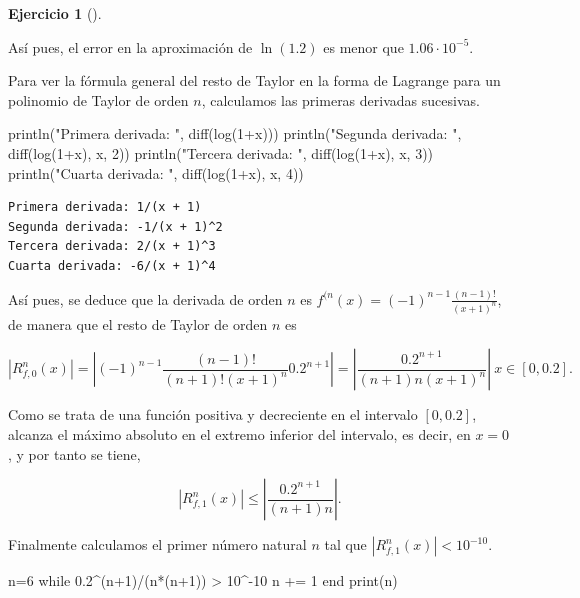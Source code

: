 \documentclass[
  a4paper,
]{scrreport}
\newenvironment{Shaded}{\begin{snugshade}}{\end{snugshade}}
\newcommand{\ControlFlowTok}[1]{\textcolor[rgb]{0.00,0.23,0.31}{#1}}
\newcommand{\FloatTok}[1]{\textcolor[rgb]{0.68,0.00,0.00}{#1}}
\newcommand{\FunctionTok}[1]{\textcolor[rgb]{0.28,0.35,0.67}{#1}}
\newcommand{\NormalTok}[1]{\textcolor[rgb]{0.00,0.23,0.31}{#1}}
\newcommand{\OperatorTok}[1]{\textcolor[rgb]{0.37,0.37,0.37}{#1}}
\newcommand{\StringTok}[1]{\textcolor[rgb]{0.13,0.47,0.30}{#1}}
\theoremstyle{definition}
\newtheorem{exercise}{Ejercicio}[chapter]
\theoremstyle{remark}
\begin{document}
\begin{exercise}[]
\begin{tcolorbox}
Así pues, el error en la aproximación de \(\ln(1.2)\) es menor que
\(1.06\cdot 10^{-5}\).

Para ver la fórmula general del resto de Taylor en la forma de Lagrange
para un polinomio de Taylor de orden \(n\), calculamos las primeras
derivadas sucesivas.

\begin{Shaded}
\begin{Highlighting}[]
\FunctionTok{println}\NormalTok{(}\StringTok{"Primera derivada: "}\NormalTok{, }\FunctionTok{diff}\NormalTok{(}\FunctionTok{log}\NormalTok{(}\FloatTok{1}\OperatorTok{+}\NormalTok{x)))}
\FunctionTok{println}\NormalTok{(}\StringTok{"Segunda derivada: "}\NormalTok{, }\FunctionTok{diff}\NormalTok{(}\FunctionTok{log}\NormalTok{(}\FloatTok{1}\OperatorTok{+}\NormalTok{x), x, }\FloatTok{2}\NormalTok{))}
\FunctionTok{println}\NormalTok{(}\StringTok{"Tercera derivada: "}\NormalTok{, }\FunctionTok{diff}\NormalTok{(}\FunctionTok{log}\NormalTok{(}\FloatTok{1}\OperatorTok{+}\NormalTok{x), x, }\FloatTok{3}\NormalTok{))}
\FunctionTok{println}\NormalTok{(}\StringTok{"Cuarta derivada: "}\NormalTok{, }\FunctionTok{diff}\NormalTok{(}\FunctionTok{log}\NormalTok{(}\FloatTok{1}\OperatorTok{+}\NormalTok{x), x, }\FloatTok{4}\NormalTok{))}
\end{Highlighting}
\end{Shaded}

\begin{verbatim}
Primera derivada: 1/(x + 1)
Segunda derivada: -1/(x + 1)^2
Tercera derivada: 2/(x + 1)^3
Cuarta derivada: -6/(x + 1)^4
\end{verbatim}

Así pues, se deduce que la derivada de orden \(n\) es
\(f^{(n}(x)=(-1)^{n-1}\frac{(n-1)!}{(x+1)^n}\), de manera que el resto
de Taylor de orden \(n\) es

\[
|R^n_{f,0}(x)| =\left|(-1)^{n-1}\frac{(n-1)!}{(n+1)!(x+1)^n}0.2^{n+1}\right| = \left|\frac{0.2^{n+1}}{(n+1)n(x+1)^n}\right|\ x\in [0,0.2].
\]

Como se trata de una función positiva y decreciente en el intervalo
\([0,0.2]\), alcanza el máximo absoluto en el extremo inferior del
intervalo, es decir, en \(x=0\), y por tanto se tiene,

\[
|R^n_{f,1}(x)| \leq \left|\frac{0.2^{n+1}}{(n+1)n}\right|.
\]

Finalmente calculamos el primer número natural \(n\) tal que
\(|R^n_{f,1}(x)|<10^{-10}\).

\begin{Shaded}
\begin{Highlighting}[]
\NormalTok{n}\OperatorTok{=}\FloatTok{6}
\ControlFlowTok{while} \FloatTok{0.2}\OperatorTok{\^{}}\NormalTok{(n}\OperatorTok{+}\FloatTok{1}\NormalTok{)}\OperatorTok{/}\NormalTok{(}\FunctionTok{n*}\NormalTok{(n}\OperatorTok{+}\FloatTok{1}\NormalTok{)) }\OperatorTok{\textgreater{}} \FloatTok{10}\OperatorTok{\^{}{-}}\FloatTok{10}
\NormalTok{    n }\OperatorTok{+=} \FloatTok{1}
\ControlFlowTok{end}
\FunctionTok{print}\NormalTok{(n)}
\end{Highlighting}
\end{Shaded}


\end{tcolorbox}
\end{exercise}
\end{document}
